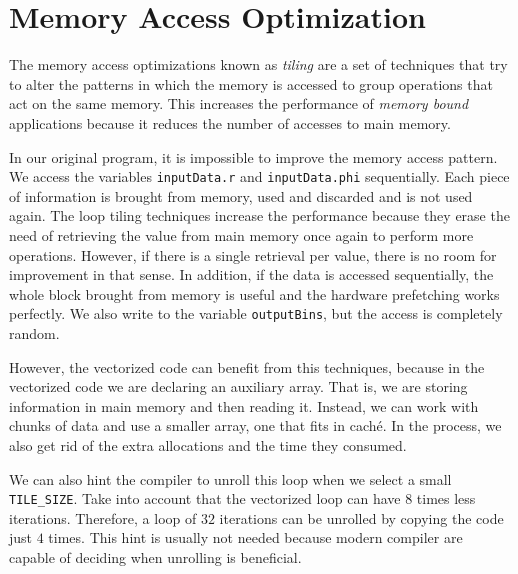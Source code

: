 \documentclass[
    12pt, %
]{fphw}
\newcommand{\tech}{\texttt}
\begin{document}
\section{Memory Access Optimization}

    The memory access optimizations known as \textit{tiling} are a set
of techniques that try to alter the patterns in which the memory is accessed
to group operations that act on the same memory.
This increases the performance of \textit{memory bound} applications because
it reduces the number of accesses to main memory.

    In our original program, it is impossible to improve the memory access pattern.
We access the variables \tech{inputData.r} and \tech{inputData.phi} sequentially.
Each piece of information is brought from memory, used and discarded
and is not used again.
The loop tiling techniques increase the performance because they erase the need
of retrieving the value from main memory once again to perform more operations.
However, if there is a single retrieval per value,
there is no room for improvement in that sense.
In addition, if the data is accessed sequentially,
the whole block brought from memory is useful and
the hardware prefetching works perfectly.
We also write to the variable \tech{outputBins},
but the access is completely random.

    However, the vectorized code can benefit from this techniques,
because in the vectorized code we are declaring an auxiliary array.
That is, we are storing information in main memory and then reading it.
Instead, we can work with chunks of data and use a smaller array,
one that fits in caché.
In the process, we also get rid of the extra allocations and the time they consumed.

We can also hint the compiler to unroll this loop
when we select a small \tech{TILE\_SIZE}.
Take into account that the vectorized loop can have $8$ times less iterations.
Therefore, a loop of $32$ iterations can be unrolled by copying the code just $4$ times.
This hint is usually not needed because
modern compiler are capable of deciding when unrolling is beneficial.
\end{document}
